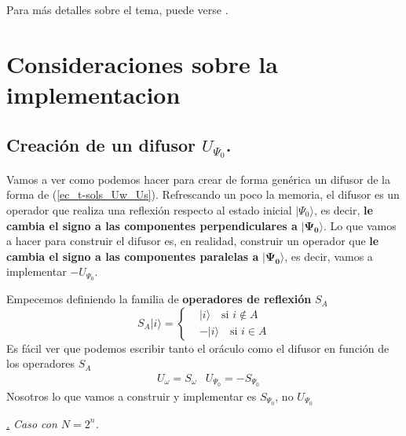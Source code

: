 \documentclass[a4paper,11pt]{book} %
\numberwithin{equation}{chapter}
\def\lch{\left\{}
\def\subsubiContadorIt{\par\addtocounter{subsubsection}{1}\underline{\it\thesubsubsection.}\hskip0.5cm \setcounter{subsubsubsectionIt}{0}}
\newcommand{\SubsubiIt}[1]{
		\subsubiContadorIt \textit{#1}
	}
\newcounter{subsubsubsectionIt}[subsubsection]
\begin{document}
Para más detalles sobre el tema, puede verse \cite{bib_Approximate_QC}.




\section{Consideraciones sobre la implementacion} \label{sec_cons_imple}

\subsection{Creación de un difusor $U_{\Psi_0}$.} \label{sec_subsec_U_s}

Vamos a ver como podemos hacer para crear de forma genérica un difusor de la forma de (\ref{ec_t-sols_Uw_Us}). Refrescando un poco la memoria, el difusor es un operador que realiza una reflexión respecto al estado inicial $| \Psi_0 \rangle$, es decir, \textbf{le cambia el signo a las componentes perpendiculares a} $\bm{| \Psi_0 \rangle}$. Lo que vamos a hacer para construir el difusor es, en realidad, construir un operador que  \textbf{le cambia el signo a las componentes paralelas a} $\bm{| \Psi_0 \rangle}$, es decir, vamos a implementar $-U_{\Psi_0}$. 

Empecemos definiendo la familia de \textbf{operadores de reflexión} $S_A$
\begin{equation} \label{ec_consideraciones_S_a}
\boxed{S_A | i \rangle = 
	\lch
		\begin{matrix}
			& | i \rangle \quad \text{si } i \not \in A \\
			& - | i \rangle \quad \text{si } i \in A
		\end{matrix}
	\right.}
\end{equation}
Es fácil ver que podemos escribir tanto el oráculo como el difusor en función de los operadores $S_A$
\begin{equation} 
\begin{aligned}
& U_\omega = S_\omega
& \boxed{U_{\Psi_0} = - S_{\Psi_0}}
\end{aligned}
\end{equation}
Nosotros lo que vamos a construir y implementar es $S_{\Psi_0}$, no $U_{\Psi_0}$

\SubsubiIt{Caso con $N = 2^n$.}
\end{document}
